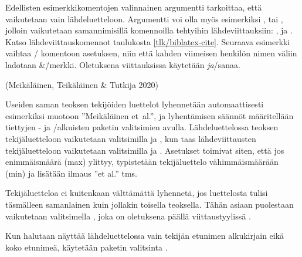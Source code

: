 Edellisten esimerkkikomentojen valinnainen argumentti 
tarkoittaa, että vaikutetaan vain lähdeluetteloon. Argumentti voi olla
myös esimerkiksi ,  tai ,
jolloin vaikutetaan samannimisillä komennoilla tehtyihin
lähdeviittauksiin: ,  ja
. Katso lähdeviittauskomennot taulukosta
\ref{tlk/biblatex-cite}. Seuraava esimerkki vaihtaa
\-/ komentoon asetuksen, niin että kahden viimeisen
henkilön nimen väliin ladotaan \&\=/merkki. Oletuksena viittauksissa
käytetään \textit{ja}\-/sanaa.

\begin{koodilohkosis}
\end{koodilohkosis}

\begin{tulossis}
  (Meikäläinen, Teikäläinen \& Tutkija 2020)
\end{tulossis}

Useiden saman teoksen tekijöiden luettelot lyhennetään automaattisesti
esimerkiksi muotoon ''Meikäläinen et~al.'', ja lyhentämisen säännöt
määritellään tiettyjen - ja \-/alkuisten paketin
valitsimien avulla. Lähdeluettelossa teoksen tekijäluetteloon
vaikutetaan valitsimilla  ja
, kun taas lähdeviittausten tekijäluetteloon
vaikutetaan valitsimilla  ja
. Asetukset toimivat siten, että jos
enimmäismäärä (max) ylittyy, typistetään tekijäluettelo vähimmäismäärään
(min) ja lisätään ilmaus ''et al.'' tms.

Tekijäluetteloa ei kuitenkaan välttämättä lyhennetä, jos luettelosta
tulisi täsmälleen samanlainen kuin jollakin toisella teoksella. Tähän
asiaan puolestaan vaikutetaan valitsimella , joka on
oletuksena päällä viittaustyylissä .

\begin{koodilohkosis}
\usepackage[style=authoryear, maxbibnames=99, minbibnames=3,
  maxcitenames=3, mincitenames=1, uniquelist=true]{biblatex}
\end{koodilohkosis}

Kun halutaan näyttää lähdeluettelossa vain tekijän etunimen alkukirjain
eikä koko etunimeä, käytetään paketin valitsinta .

\begin{koodilohkosis}
\usepackage[…, giveninits]{biblatex}
\end{koodilohkosis}

